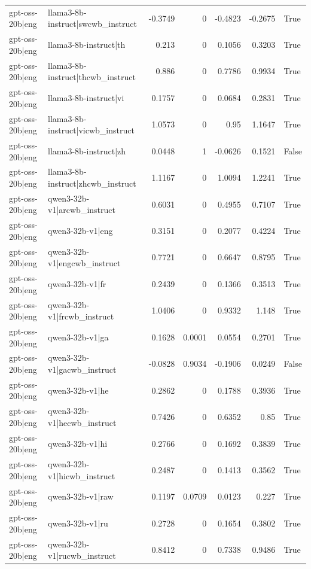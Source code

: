 \begin{table}
\begin{tabular}{l l r r r r l}
gpt-oss-20b|eng & llama3-8b-instruct|swcwb_instruct & -0.3749 & 0 & -0.4823 & -0.2675 & True \\
gpt-oss-20b|eng & llama3-8b-instruct|th & 0.213 & 0 & 0.1056 & 0.3203 & True \\
gpt-oss-20b|eng & llama3-8b-instruct|thcwb_instruct & 0.886 & 0 & 0.7786 & 0.9934 & True \\
gpt-oss-20b|eng & llama3-8b-instruct|vi & 0.1757 & 0 & 0.0684 & 0.2831 & True \\
gpt-oss-20b|eng & llama3-8b-instruct|vicwb_instruct & 1.0573 & 0 & 0.95 & 1.1647 & True \\
gpt-oss-20b|eng & llama3-8b-instruct|zh & 0.0448 & 1 & -0.0626 & 0.1521 & False \\
gpt-oss-20b|eng & llama3-8b-instruct|zhcwb_instruct & 1.1167 & 0 & 1.0094 & 1.2241 & True \\
gpt-oss-20b|eng & qwen3-32b-v1|arcwb_instruct & 0.6031 & 0 & 0.4955 & 0.7107 & True \\
gpt-oss-20b|eng & qwen3-32b-v1|eng & 0.3151 & 0 & 0.2077 & 0.4224 & True \\
gpt-oss-20b|eng & qwen3-32b-v1|engcwb_instruct & 0.7721 & 0 & 0.6647 & 0.8795 & True \\
gpt-oss-20b|eng & qwen3-32b-v1|fr & 0.2439 & 0 & 0.1366 & 0.3513 & True \\
gpt-oss-20b|eng & qwen3-32b-v1|frcwb_instruct & 1.0406 & 0 & 0.9332 & 1.148 & True \\
gpt-oss-20b|eng & qwen3-32b-v1|ga & 0.1628 & 0.0001 & 0.0554 & 0.2701 & True \\
gpt-oss-20b|eng & qwen3-32b-v1|gacwb_instruct & -0.0828 & 0.9034 & -0.1906 & 0.0249 & False \\
gpt-oss-20b|eng & qwen3-32b-v1|he & 0.2862 & 0 & 0.1788 & 0.3936 & True \\
gpt-oss-20b|eng & qwen3-32b-v1|hecwb_instruct & 0.7426 & 0 & 0.6352 & 0.85 & True \\
gpt-oss-20b|eng & qwen3-32b-v1|hi & 0.2766 & 0 & 0.1692 & 0.3839 & True \\
gpt-oss-20b|eng & qwen3-32b-v1|hicwb_instruct & 0.2487 & 0 & 0.1413 & 0.3562 & True \\
gpt-oss-20b|eng & qwen3-32b-v1|raw & 0.1197 & 0.0709 & 0.0123 & 0.227 & True \\
gpt-oss-20b|eng & qwen3-32b-v1|ru & 0.2728 & 0 & 0.1654 & 0.3802 & True \\
gpt-oss-20b|eng & qwen3-32b-v1|rucwb_instruct & 0.8412 & 0 & 0.7338 & 0.9486 & True \\

\end{tabular}
\end{table}
